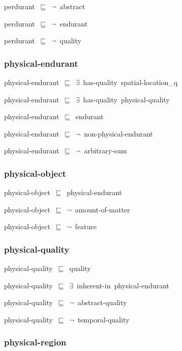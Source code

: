 \documentclass{article}
\begin{document}
perdurant~\ensuremath{\sqsubseteq}~\ensuremath{\lnot}~abstract

perdurant~\ensuremath{\sqsubseteq}~\ensuremath{\lnot}~endurant

perdurant~\ensuremath{\sqsubseteq}~\ensuremath{\lnot}~quality

\subsubsection*{physical-endurant}

physical-endurant~\ensuremath{\sqsubseteq}~\ensuremath{\exists}~has-quality~spatial-location\_q~

physical-endurant~\ensuremath{\sqsubseteq}~\ensuremath{\exists}~has-quality~physical-quality~

physical-endurant~\ensuremath{\sqsubseteq}~endurant~

physical-endurant~\ensuremath{\sqsubseteq}~\ensuremath{\lnot}~non-physical-endurant

physical-endurant~\ensuremath{\sqsubseteq}~\ensuremath{\lnot}~arbitrary-sum

\subsubsection*{physical-object}

physical-object~\ensuremath{\sqsubseteq}~physical-endurant~

physical-object~\ensuremath{\sqsubseteq}~\ensuremath{\lnot}~amount-of-matter

physical-object~\ensuremath{\sqsubseteq}~\ensuremath{\lnot}~feature

\subsubsection*{physical-quality}

physical-quality~\ensuremath{\sqsubseteq}~quality~

physical-quality~\ensuremath{\sqsubseteq}~\ensuremath{\exists}~inherent-in~physical-endurant~

physical-quality~\ensuremath{\sqsubseteq}~\ensuremath{\lnot}~abstract-quality

physical-quality~\ensuremath{\sqsubseteq}~\ensuremath{\lnot}~temporal-quality

\subsubsection*{physical-region}
\end{document}
